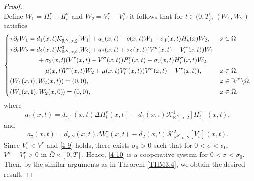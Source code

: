 \documentclass[11pt,reqno]{amsart}
\numberwithin{equation}{section}
\begin{document}
\begin{proof}
\begin{equation*}
\end{equation*}
Define $W_{1} = H_{i}^{r} - H_{i}^{\sigma}$ and $W_{2} = V_{i}^{r} - V_{i}^{\sigma}$, it follows that for  $t\in (0,T]$, $(W_{1},W_{2})$ satisfies
%
\begin{equation}\label{4-10}
\left\{
\begin{aligned}
&\tau \partial_{t} W_{1} = d_{1}(x,t)\mathcal{K}^{1}_{\mathbb{R}^{N},\sigma,2}[W_{1}] + a_{1}(x,t) - \rho(x,t)W_{1} + \sigma_{1}(x,t)H_{u}(x)W_{2},
&x&\in\bar\Omega \\
&\tau \partial_{t} W_{2}
=
d_{2}(x,t)\mathcal{K}^{2}_{\mathbb{R}^{N},\sigma,2}[W_{2}] + a_{2}(x,t) + \sigma_{2}(x,t)(V^{\sigma}(x,t)-V_{i}^{r}(x,t))W_{1} \\
&\hspace{1.5cm}+ \sigma_{2}(x,t)( V^{r}(x,t) - V^{\sigma}(x,t) )H_{i}^{r}(x,t) - \sigma_{2}(x,t)H^{\sigma}_{i}(x,t)W_{2} \\
&\hspace{1.5cm} - \mu(x,t) V^{r}(x,t) W_{2} + \mu(x,t)V_{i}^{\sigma}(x,t)(V^{\sigma}(x,t) - V^{r}(x,t)),
&x&\in\bar\Omega,\\
& (W_{1}(x,t),W_{2}(x,t) ) = (0,0), &x&\in \mathbb{R}^{N}\backslash\bar\Omega,\\
& (W_{1}(x,0), W_{2}(x,0) ) = (0,0),
&x&\in \bar{\Omega},
\end{aligned}
\right.
\end{equation}
where
\begin{equation*}
a_{1}(x,t) = d_{r,1}(x,t) \Delta H_{i}^{r}(x,t) - d_{1}(x,t)\mathcal{K}^{1}_{\mathbb{R}^{N},\sigma,2}[H_{i}^{r}](x,t),
\end{equation*}
and
\begin{equation*}
a_{2}(x,t) = d_{r,2}(x,t) \Delta V_{i}^{r}(x,t) - d_{2}(x,t)\mathcal{K}^{2}_{\mathbb{R}^{N},\sigma,2}[V_{i}^{r}](x,t).
\end{equation*}
Since $V_{i}^{r}<V^{r}$ and \eqref{4-9} holds, there exists $\sigma_{0}>0$ such that for $0<\sigma<\sigma_{0}$, $V^{\sigma}-V_{i}^{r}>0$ in $\bar{\Omega} \times [0,T]$. Hence, \eqref{4-10} is a cooperative system for $0< \sigma < \sigma_{0}$.
Then, by the similar arguments as in Theorem \ref{THM3.4}, we obtain the desired result.

\end{proof}
\end{document}
